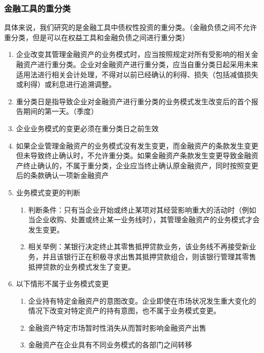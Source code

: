 \documentclass[UTF8,12pt]{ctexart}
\numberwithin{equation}{section} %
\numberwithin{figure}{section}
\numberwithin{table}{section}
\begin{document}
	
	\subsubsection{金融工具的重分类}
	具体来说，我们研究的是金融工具中债权性投资的重分类。（金融负债之间不允许重分类，但是可以在权益工具和金融负债之间进行重分类）
	
	\begin{enumerate}
		\item 企业改变其管理金融资产的业务模式时，应当按照规定对所有受影响的相关金融资产进行重分类。企业对金融资产进行重分类，应当自重分类日起采用未来适用法进行相关会计处理，不得对以前已经确认的利得、损失（包括减值损失或利得）或利息进行追溯调整。
		
		\item 重分类日是指导致企业对金融资产进行重分类的业务模式发生改变后的首个报告期间的第一天。（季度）
		
		\item 企业业务模式的变更必须在重分类日之前生效
		
		\item 如果企业管理金融资产的业务模式没有发生变更，而金融资产的条款发生变更但未导致终止确认时，不允许重分类。如果金融资产条款发生变更导致金融资产终止确认的，不属于重分类，企业应当终止确认原金融资产，同时按照变更后的条款确认一项新金融资产
		
		\item 业务模式变更的判断
		\begin{enumerate}
			\item 判断条件：只有当企业开始或终止某项对其经营影响重大的活动时（例如当企业收购、处置或终止某一业务线时），其管理金融资产的业务模式才会发生变更。
			
			\item 相关举例：某银行决定终止其零售抵押贷款业务，该业务线不再接受新业务，并且该银行正在积极寻求出售其抵押贷款组合，则该银行管理其零售抵押贷款的业务模式发生了变更。
		\end{enumerate}
	
		\item 以下情形不属于业务模式变更
		\begin{enumerate}
			\item 企业持有特定金融资产的意图改变。企业即使在市场状况发生重大变化的情况下改变对特定资产的持有意图，也不属于业务模式变更。
			
			\item 金融资产特定市场暂时性消失从而暂时影响金融资产出售
			
			\item 金融资产在企业具有不同业务模式的各部门之间转移
		\end{enumerate}
	\end{enumerate}
	
\end{document}
